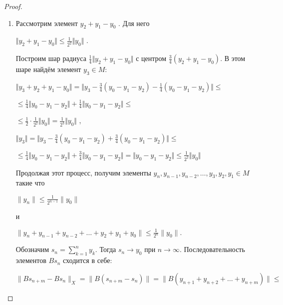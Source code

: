 \documentclass[12pt,a4paper,titlepage,oneside]{book}
\theoremstyle{definition}
\theoremstyle{plain}
\theoremstyle{remark}
\theoremstyle{remark}
\theoremstyle{remark}
\theoremstyle{remark}
\theoremstyle{plain}
\theoremstyle{plain}
\begin{document}
\begin{proof}
\begin{enumerate}
	\item Рассмотрим элемент $y_2+y_1- y_0$ . Для него 	\begin{center}	
	$\Vert y_2+y_1- y_0 \Vert \leqslant
	\frac{1}{2^2} \Vert y_0 \Vert$ .
	\end{center}
	Построим шар радиуса
	$\frac{1}{4} \Vert y_2 + y_1 - y_0 \Vert$      	с центром $\frac{3}{4}(y_2 + y_1 - y_0)$.
	В этом шаре найдём элемент 	$y_3 \in M$:
	\begin{center}
	$\Vert y_3 + y_2 + y_1 - y_0 \Vert =
	\Vert y_3 - \frac{3}{4}(y_0 - y_1 - y_2) -
	\frac{1}{4}(y_0 - y_1 - y_2) \Vert \leqslant $
	\end{center}
	\begin{center}
	$\leqslant \frac{1}{4} \Vert y_0 - y_1 - y_2 \Vert +
	\frac{1}{4} \Vert y_0 - y_1 - y_2 \Vert 			\leqslant $
	\end{center}
	\begin{center}
	$ \leqslant\frac{1}{2} \cdot
	\frac{1}{2^2} \Vert y_0 \Vert =
	\frac{1}{2^3} \Vert y_0 \Vert$ ,
	\end{center}
	\begin{center}
	$\Vert y_3 \Vert =
	\Vert y_3 - \frac{3}{4}(y_0 - y_1 - y_2) +
	\frac{3}{4}(y_0 - y_1 - y_2) \Vert \leqslant $
	\end{center}
	\begin{center}
	$\leqslant \frac{1}{4} \Vert y_0 - y_1 - y_2 				\Vert +
	\frac{3}{4} \Vert y_0 - y_1 - y_2 \Vert =
	 \Vert y_0 - y_1 - y_2 \Vert \leqslant
	 \frac{1}{2^2} \Vert y_0 \Vert$
	\end{center}

Продолжая этот процесс, получим элементы $y_n, y_{n-1}, y_{n-2}, \ldots, y_3, y_2, y_1 \in M$ такие что 

\begin{center}
$\lVert y_n \rVert \leqslant \frac{1}{2^{n-1}} \lVert y_0 \rVert$

и

$\lVert y_n + y_{n-1}+y_{n-2}+\ldots+y_2+y_1+y_0 \rVert \leqslant \frac{1}{2^n} \lVert y_0 \rVert.$
\end{center}

Обозначим $s_n= \displaystyle\sum\limits_{k=1}^n y_k$. Тогда $s_n \to y_0$ при $n \to \infty$. Последовательность элементов $B s_n$ сходится в себе:

\begin{center}
$ \lVert B s_{n+m}-B s_n \rVert _X = \lVert B(s_{n+m}-s_n) \rVert= \lVert B(y_{n+1}+y_{n+2}+\ldots+y_{n+m}) \rVert \leqslant $
\end{center}


\end{enumerate}
\end{proof}
\end{document}
